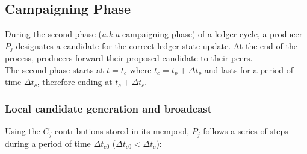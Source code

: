 
\subsection{Campaigning Phase}

During the second phase (\textit{a.k.a} campaigning phase) of a ledger cycle, a producer $P_j$ designates a candidate for the correct ledger state update. At the end of the process, producers forward their proposed candidate to their peers. \\

The second phase starts at $t = t_c$ where $t_c = t_p + \Delta t_{p}$ and lasts for a period of time $\Delta t_{c}$, therefore ending at $t_c+\Delta t_{c}$.

\subsubsection{Local candidate generation and broadcast}
\label{subs:lv}
Using the $C_j$ contributions stored in its mempool, $P_j$ follows a series of steps during a period of time $\Delta t_{c0}$ ($\Delta t_{c0} < \Delta t_{c}$):

